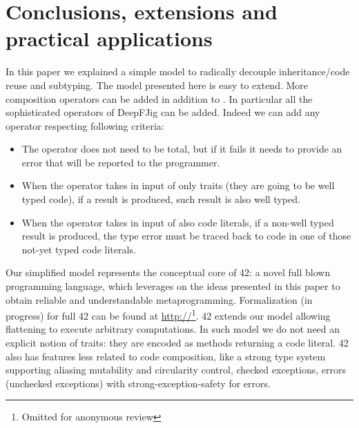 \section{Conclusions, extensions and practical applications}

In this paper we explained a simple model to 
radically decouple inheritance/code reuse and subtyping.
The model presented here is easy to extend.
More composition operators can be added in addition to \use.
In particular all the sophisticated operators of DeepFJig can be added.
 Indeed we can add any operator respecting following criteria:

\begin{itemize}
\item The operator does not need to be total, but if it fails it needs to provide an error that will be reported to the programmer.
\item When the operator takes in input of only traits (they are going to be well typed code), if a result is produced,
 such result is also well typed.
\item When the operator takes in input of also code literals, if a non-well typed result is produced,
the type error must be traced back to code in one of those not-yet typed code literals.
 \end{itemize}
 

 
 Our simplified model represents the conceptual core of  42: a novel full blown programming language,
which leverages on the ideas presented in this paper to obtain reliable and understandable metaprogramming.
Formalization (in progress) for full 42 can be found at
\url{http://}\footnote{Omitted for anonymous review}. 
42 extends our model allowing
flattening to execute arbitrary computations.
In such model we do not need an explicit notion of traits: they are encoded as methods returning a code literal.
42 also has features less related to code composition, like
  a strong type system supporting aliasing mutability and circularity control,
   checked exceptions, errors (unchecked exceptions) with strong-exception-safety for errors.

\begin{comment}
42 do not have a finite set of composition operators; they can be
added using the built in support for native method calls. They can
be dynamically checked to verify that they are well behaved
according to our predicate, or they can be trusted to achieve
efficiency.
\end{comment}

